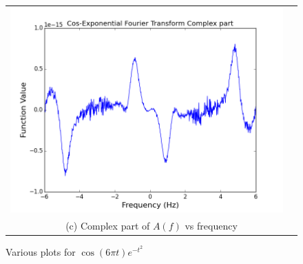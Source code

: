 \documentclass[11pt]{article}
\begin{document}
\begin{figure}[H]
\begin{tabular}{cc}
\includegraphics[scale=.4]{cos_fourComp.png}\\
\multicolumn{2}{c}{(c) Complex part of $A(f)$ vs frequency} \\[6pt]
\end{tabular}
\caption{Various plots for $\cos (6\pi t) e^{-t^2} $}
\end{figure}
\end{document}
